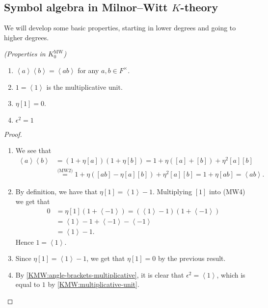 \documentclass[11pt,openany]{book}
\providecommand{\MW}{\mathrm{MW}}
\begin{document}
\subsection{Symbol algebra in Milnor--Witt $K$-theory}

We will develop some basic properties, starting in lower degrees and going to higher degrees.


\begin{proposition}\label{prop:properties-KMW0} 
\textit{(Properties in $K_0^\MW$)}
\begin{enumerate}
    \item\label{KMW:angle-brackets-multiplicative}
    $\left\langle a \right\rangle \left\langle b \right\rangle = \left\langle ab \right\rangle$ for any $a,b \in F^\times$.
    \item\label{KMW:multiplicative-unit}
    $1 = \left\langle 1 \right\rangle$ is the multiplicative unit.
    \item\label{KMW:bracket-1}
    $\eta[1] = 0$.
    \item\label{KMW:epsilon-squared}
    $\epsilon^2 = 1$
\end{enumerate}
\end{proposition}
\begin{proof} $\ $
\begin{enumerate}
    \item We see that
    \begin{align*}
    \left\langle a \right\rangle \left\langle b  \right\rangle &= \left( 1 + \eta[a] \right) \left( 1 + \eta[b] \right) = 1 + \eta([a]+[b]) + \eta^2[a][b] \\
    &\overset{\text{(MW2)}}{=} 1 + \eta \left( [ab] - \eta [a][b] \right) + \eta^2[a][b] = 1 + \eta[ab] = \left\langle ab \right\rangle.
\end{align*}
    \item By definition, we have that $\eta[1] = \left\langle 1 \right\rangle - 1$. Multiplying $[1]$ into (MW4) we get that
\begin{align*}
    0 &= \eta[1] (1 + \left\langle -1 \right\rangle) = \left( \left\langle 1 \right\rangle - 1 \right) \left( 1 + \left\langle -1 \right\rangle \right) \\
    &= \left\langle 1 \right\rangle - 1 + \left\langle -1 \right\rangle - \left\langle -1 \right\rangle \\
    &= \left\langle 1 \right\rangle - 1.
\end{align*}
Hence $1 = \left\langle 1 \right\rangle$.

    \item Since $\eta[1] = \left\langle 1 \right\rangle - 1$, we get that $\eta[1] = 0$ by the previous result.

    \item By \ref{KMW:angle-brackets-multiplicative}, it is clear that $\epsilon^2 = \left\langle 1 \right\rangle$, which is equal to $1$ by \ref{KMW:multiplicative-unit}.
\end{enumerate}
\end{proof}
\end{document}

